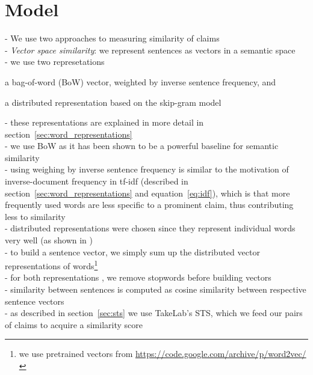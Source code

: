 \section{Model}

- We use two approaches to measuring similarity of claims \\
- \textit{Vector space similarity}: we represent sentences as vectors in a semantic space  \\
- we use two represetations \begin{enumerate*} \item a bag-of-word (BoW) vector, weighted
by inverse sentence frequency, and \item a distributed representation based on the
skip-gram model \citep{mikolov2013distributed} \\
\end{enumerate*}
- these representations are explained in more detail in 
section~\ref{sec:word_representations} \\
- we use BoW as it has been shown to be a powerful baseline for semantic similarity 
\citep{ramage2009random} \\
- using weighing by inverse sentence frequency is similar to the motivation 
of inverse-document frequency in tf-idf (described in section~\ref{sec:word_representations} and
equation~\ref{eq:idf}), which is that more frequently used words are less
specific to a prominent claim, thus contributing less to similarity  \\
- distributed representations were chosen since they represent individual words 
very well (as shown in \citep{mikolov2013efficient, mikolov2013distributed}) \\
- to build a sentence vector, we simply sum up the distributed vector representations 
of words\footnote{we use pretrained vectors from \url{https://code.google.com/archive/p/word2vec/}} \\
- for both representations , we remove stopwords before building vectors \\
- similarity between sentences is computed as cosine similarity between 
respective sentence vectors \\
- as described in section~\ref{sec:sts} we use TakeLab's STS, which we feed our pairs
of claims to acquire a similarity score \\

